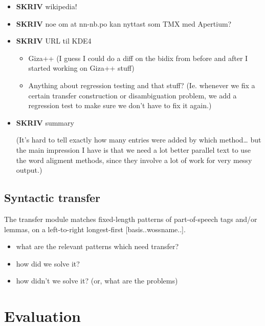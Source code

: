 \documentclass[11pt]{article}
\begin{document}
\begin{itemize}

\item \textbf{SKRIV} wikipedia!\\
\label{sec-3.4.1}


\item \textbf{SKRIV} noe om at nn-nb.po kan nyttast som TMX med Apertium?\\
\label{sec-3.4.2}




\item \textbf{SKRIV} URL til KDE4\\
\label{sec-3.4.3}


\begin{itemize}
\item Giza++ (I guess I could do a diff on the bidix from before and after
  I started working on Giza++ stuff)
\item Anything about regression testing and that stuff? (Ie. whenever we
  fix a certain transfer construction or disambiguation problem, we
  add a regression test to make sure we don't have to fix it again.)
\end{itemize}

\item \textbf{SKRIV} summary\\
\label{sec-3.4.4}

(It's hard to tell exactly how many entries were added by which
method\ldots{} but the main impression I have is that we need a lot better
parallel text to use the word aligment methods, since they involve a
lot of work for very messy output.)

\end{itemize} %
\subsection{Syntactic transfer}
\label{sec-3.5}

The transfer module matches fixed-length patterns of part-of-speech
tags and/or lemmas, on a left-to-right longest-first
[basis..wossname..]. 

\begin{itemize}
\item what are the relevant patterns which need transfer?
\item how did we solve it?
\item how didn't we solve it? (or, what are the problems)
\end{itemize}
\section{Evaluation}
\label{sec-4}
\end{document}
